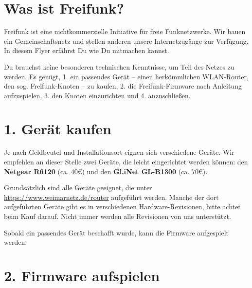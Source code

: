 \documentclass[10pt,a4paper,notumble]{leaflet}
\begin{document}
\thispagestyle{empty}
\newpage

\section{Was ist Freifunk?}
Freifunk ist eine nichtkommerzielle Initiative für freie Funk\-netzwerke. Wir bauen ein Gemeinschaftsnetz und stellen anderen unsere Internetzugänge zur Verfügung. In diesem Flyer erfährst Du wie Du mitmachen kannst.

Du brauchst keine besonderen technischen Kenntnisse, um Teil des Netzes zu werden. Es genügt, 1. ein passendes Gerät -- einen herkömmlichen WLAN-Router, den sog. Freifunk-Knoten -- zu kaufen, 2. die Freifunk-Firmware nach Anleitung aufzuspielen, 3. den Knoten einzurichten und 4. anzuschließen.


\section{1. Gerät kaufen}
Je nach Geldbeutel und Installationsort eignen sich verschiedene Geräte. Wir empfehlen an dieser Stelle zwei Geräte, die leicht eingerichtet werden können: den \textbf{Netgear R6120} (ca. 40€) und den \textbf{Gl.iNet GL-B1300} (ca. 70€).

Grundsätzlich sind alle Geräte geeignet, die unter \href{https://www.weimarnetz.de/router}{https://www.weimarnetz.de/router} aufgeführt werden. Manche der dort aufgeführten Geräte gibt es in verschiedenen Hardware-Revisionen, bitte achtet beim Kauf darauf. Nicht immer werden alle Revisionen von uns unterstützt.

Sobald ein passendes Gerät beschafft wurde, kann die Firmware aufgespielt werden.


\newpage


\section{2. Firmware aufspielen}
\end{document}
